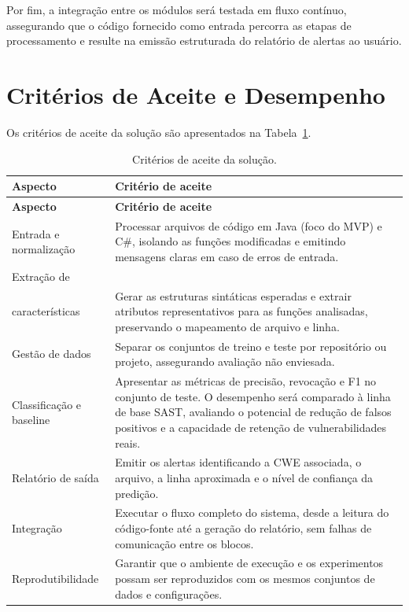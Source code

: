 Por fim, a integração entre os módulos será testada em fluxo contínuo, assegurando que o código fornecido como entrada percorra as etapas de processamento e resulte na emissão estruturada do relatório de alertas ao usuário.

\newpage

\section{Critérios de Aceite e Desempenho}

Os critérios de aceite da solução são apresentados na Tabela~\ref{tab:criterios_aceite}.

\begin{longtable}{p{} p{}}
    \caption{Critérios de aceite da solução.}
    \label{tab:criterios_aceite} \\
    \toprule
    \textbf{Aspecto} & \textbf{Critério de aceite} \\
    \midrule
    \endfirsthead
    \toprule
    \textbf{Aspecto} & \textbf{Critério de aceite} \\
    \midrule
    \endhead
    Entrada e normalização & Processar arquivos de código em Java (foco do MVP) e C\#, isolando as funções modificadas e emitindo mensagens claras em caso de erros de entrada. \\
    \addlinespace
    Extração de \\características & Gerar as estruturas sintáticas esperadas e extrair atributos representativos para as funções analisadas, preservando o mapeamento de arquivo e linha. \\
    \addlinespace
    Gestão de dados & Separar os conjuntos de treino e teste por repositório ou projeto, assegurando avaliação não enviesada. \\
    \addlinespace
    Classificação e baseline & Apresentar as métricas de precisão, revocação e F1 no conjunto de teste. O desempenho será comparado à linha de base SAST, avaliando o potencial de redução de falsos positivos e a capacidade de retenção de vulnerabilidades reais. \\
    \addlinespace
    Relatório de saída & Emitir os alertas identificando a CWE associada, o arquivo, a linha aproximada e o nível de confiança da predição. \\
    \addlinespace
    Integração & Executar o fluxo completo do sistema, desde a leitura do código-fonte até a geração do relatório, sem falhas de comunicação entre os blocos. \\
    \addlinespace
    Reprodutibilidade & Garantir que o ambiente de execução e os experimentos possam ser reproduzidos com os mesmos conjuntos de dados e configurações. \\
    \bottomrule
\end{longtable}
